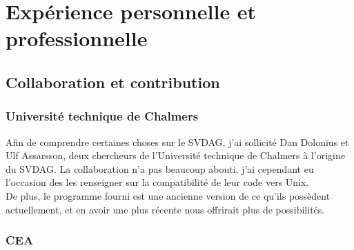 \documentclass[12pt,a4paper,twoside]{article}
\begin{document}
    \begin{figure}[H]
    \end{figure}

    \section{Expérience personnelle et professionnelle}
    \subsection{Collaboration et contribution}

    \subsubsection{Université technique de Chalmers}

    Afin de comprendre certaines choses sur le SVDAG, j'ai sollicité Dan Dolonius et Ulf Assarsson, deux chercheurs de l'Université technique de Chalmers à l'origine du SVDAG.
    La collaboration n'a pas beaucoup abouti, j'ai cependant eu l'occasion des les renseigner sur la compatibilité de leur code vers Unix.\\
    De plus, le programme fourni est une ancienne version de ce qu'ils possèdent actuellement, et en avoir une plus récente
    nous offrirait plus de possibilités.

    \subsubsection{CEA}
\end{document}
